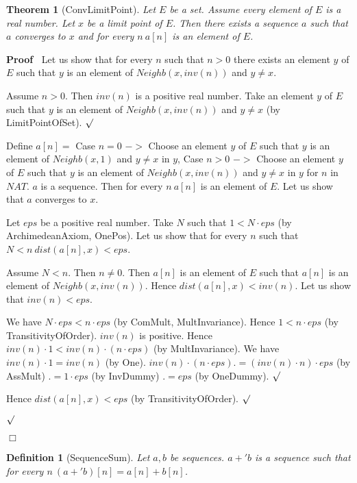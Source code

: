 \documentclass{article}
\newenvironment{forthel}{\begin{leftbar}}{\end{leftbar}}
\newenvironment{proof}{\noindent\textbf{Proof\ }}{\hspace*{\fill}$\Box$\medskip}
\newenvironment{subproof}{\begin{list}{}{}
		\item[\text{Proof}]}{\hfill $\surd$ \end{list}}
\newtheorem{theorem}{Theorem}
\newtheorem{definition}{Definition}
\begin{document}
\begin{forthel}
	\begin{theorem} [ConvLimitPoint]
	Let $E$ be a set. Assume every element of $E$ is a real number. Let $x$ be a limit point of $E$.
	Then there exists a sequence $a$ such that $a$ converges to $x$ and for every $n \ a[n]$ is an element of $E$.
	\end{theorem}
	\begin{proof}
	Let us show that for every $n$ such that $n > 0$ there exists an element $y$ of $E$ such that
	$y$ is an element of $Neighb(x,inv(n))$ and $y \neq x$.
	\begin{subproof}
	Assume $n > 0$.
	Then $inv(n)$ is a positive real number.
	Take an element $y$ of $E$ such that $y$ is an element of $Neighb(x,inv(n))$
	and $y \neq x$ (by LimitPointOfSet).
	\end{subproof}
	Define $a[n] =$ Case $n = 0$ $->$ Choose an element $y$ of $E$ such that $y$ is an element of
	$Neighb(x,1)$ and $y \neq x$ in $y$,
	Case $n > 0$ $->$ Choose an element $y$ of $E$ such that $y$ is an element of
	$Neighb(x,inv(n))$ and $y \neq x$ in $y$
	for $n$ in $NAT$.
	$a$ is a sequence.	
	Then for every $n \ a[n]$ is an element of $E$.
	Let us show that $a$ converges to $x$.
	\begin{subproof}
	Let $eps$ be a positive real number.
	Take $N$ such that $1 < N \cdot eps$ (by ArchimedeanAxiom, OnePos).
	Let us show that for every $n$ such that $N < n \ dist(a[n],x) < eps$.
	\begin{subproof}
	Assume $N < n$. Then $n \neq 0$.
	Then $a[n]$ is an element of $E$ such that $a[n]$ is an element of $Neighb(x,inv(n))$.
	Hence $dist(a[n],x) < inv(n)$.
	Let us show that $inv(n) < eps$.
	\begin{subproof}
	We have $N \cdot eps < n \cdot eps$ (by ComMult, MultInvariance).
	Hence $1 < n \cdot eps$ (by TransitivityOfOrder).
	$inv(n)$ is positive.
	Hence $inv(n) \cdot 1 < inv(n) \cdot (n \cdot eps)$ (by MultInvariance).
	We have $inv(n) \cdot 1 = inv(n)$ (by One).
	$inv(n) \cdot (n \cdot eps) .= (inv(n) \cdot n) \cdot eps$ (by AssMult)
	$.= 1 \cdot eps$ (by InvDummy)
	$.= eps$ (by OneDummy).
	\end{subproof}
	Hence $dist(a[n],x) < eps$ (by TransitivityOfOrder).
	\end{subproof}
	\end{subproof}
	\end{proof}
	
	\begin{definition} [SequenceSum]
	Let $a,b$ be sequences. $a +' b$ is a sequence such that for every $n \ (a +' b)[n] = a[n] + b[n]$.
	\end{definition}
	

\end{forthel}
\end{document}
